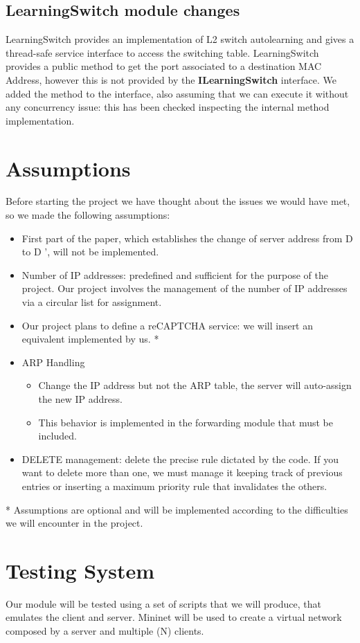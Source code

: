 \subsection{LearningSwitch module changes}
LearningSwitch provides an implementation of L2 switch autolearning and gives a thread-safe service interface to access the switching table. LearningSwitch provides a public method to get the port associated to a destination MAC Address, however this is not provided by the \textbf{ILearningSwitch} interface.
We added the method to the interface, also assuming that we can execute it without any concurrency issue: this has been checked inspecting the internal method implementation.

\section{Assumptions}
Before starting the project we have thought about the issues we would have met, so we made the following assumptions:
\begin{itemize}
	\item First part of the paper, which establishes the change of server address from D to D ', will not be implemented.
	\item Number of IP addresses: predefined and sufficient for the purpose of the project. Our project involves the management of the number of IP addresses via a circular list for assignment. 
	\item Our project plans to define a reCAPTCHA service: we will insert an equivalent implemented by us. *
	\item ARP Handling 
		\begin{itemize}
			\item Change the IP address but not the ARP table, the server will auto-assign the new IP address.
			\item This behavior is implemented in the forwarding module that must be included.
		\end{itemize}
	\item DELETE management: delete the precise rule dictated by the code. If you want to delete more than one, we must manage it keeping track of previous entries or inserting a maximum priority rule that invalidates the others.
\end{itemize}
* Assumptions are optional and will be implemented according to the difficulties we will encounter in the project.

\section{Testing System}
Our module will be tested using a set of scripts that we will produce, that emulates the client and server. Mininet will be used to create a virtual network composed  by a server and multiple (N) clients.

